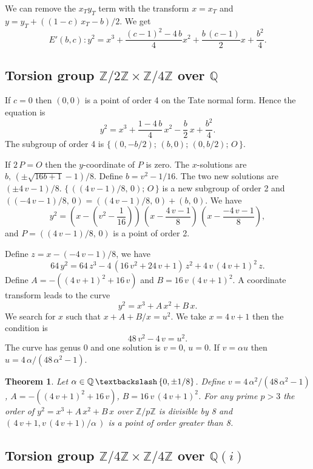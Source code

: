 \documentclass[a4paper, 11pt, pdftex]{report}
\theoremstyle{plain}
\newtheorem{theorem}{Theorem}[chapter]
\theoremstyle{definition}
\begin{document}
We can remove the $x_T y_T$ term with the transform $x = x_T$ and $y = y_T + ((1 - c)\,x_T -  b)/2$.
We get
$$E'(b, c): y^2 = x^3 + \frac{(c - 1)^2 - 4\,b}{4} x^2 + \frac{b\,(c - 1)}{2} x + \frac{b^2}{4}.$$

\subsection{Torsion group $\mathbb{Z}/2\mathbb{Z} \times \mathbb{Z}/4\mathbb{Z}$ over $\mathbb{Q}$}

If $c = 0$ then $(0, 0)$ is a point of order 4 on the Tate normal form. Hence the equation is
$$y^2 = x^3 + \frac{1 - 4\,b}{4}\, x^2 - \frac{b}{2}\, x + \frac{b^2}{4}.$$
The subgroup of order 4 is $\{\,(0, -b/2);\, (b, 0);\, (0, b/2);\, O\, \}$.

If $2\,P = O$ then the $y$-coordinate of $P$ is zero. The $x$-solutions are
$b,\, (\pm\sqrt{16 b+1} - 1)/8$. Define $b = v^2 - 1/16$. The two new solutions are
 $(\pm4\,v - 1)/8$. $\{\,((4\,v - 1)/8,\, 0);\, O\, \}$ is a new subgroup of order 2
and $((-4\,v - 1)/8,\, 0) = ((4\,v - 1)/8,\, 0) + (b,\, 0)$.
We have
$$y^2 = \left(x - \left(v^2 - \frac{1}{16}\right)\right)\,
 \left(x - \frac{4\,v - 1}{8}\right)\, \left(x - \frac{-4\,v - 1}{8}\right),$$
and $P = ((4\,v - 1)/8,\, 0)$ is a point of order 2.

Define $z = x - (-4\,v - 1)/8$, we have
$$64\, y^2 = 64\, z^3 - 4\,(16\,v^2 + 24\,v + 1)\, z^2 + 4\,v\,(4\,v + 1)^2\, z.$$
Define $A = -((4\,v+1)^2 + 16\,v)$ and $B = 16\,v\,(4\,v + 1)^2$.
A coordinate transform leads to the curve
$$y^2 = x^3 + A\, x^2 + B\, x.$$
We search for $x$ such that $x + A + B / x = u^2.$ We take $x = 4\,v + 1$ then
the condition is
$$48\,v^2 - 4\,v = u^2.$$
The curve has genus 0 and one solution is $v = 0$, $u = 0$. If $v = \alpha u$ then
$u = 4\,\alpha / (48\, \alpha^2 - 1)$.

\begin{theorem}
Let $\alpha \in \mathbb{Q}\, \textbackslash \, \{0, \pm1/8\}$.
Define $v = 4\,\alpha^2 / (48\, \alpha^2 - 1)$, $A = -((4\,v+1)^2 + 16\,v)$,
$B = 16\,v\,(4\,v + 1)^2$. For any prime $p > 3$ the order of $y^2 = x^3 + A\, x^2 + B\, x$
over $\mathbb{Z}/p\mathbb{Z}$ is divisible by 8 and $(\,4\,v + 1, v\,(4\,v + 1) / \alpha \,)$
is a point of order greater than 8.
\end{theorem}

\subsection{Torsion group $\mathbb{Z}/4\mathbb{Z} \times \mathbb{Z}/4\mathbb{Z}$ over $\mathbb{Q}(i)$}
\end{document}
